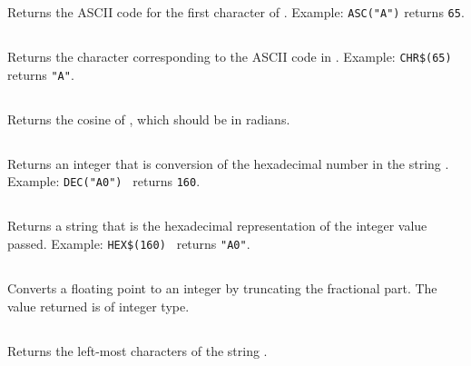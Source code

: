 \documentclass{report}
\begin{document}
    Returns the ASCII code for the first character of .
    Example: \verb+ASC("A")+ returns \verb+65+.

    \subsection*{}

    Returns the character corresponding to the ASCII code in .
    Example: \verb+CHR$(65)+ returns \verb+"A"+.
    
    \subsection*{}

    Returns the cosine of , which should be in radians.

    \subsection*{}

    Returns an integer that is conversion of the hexadecimal number in the string .
    Example: \verb+DEC("A0") + returns \verb+160+.

    \subsection*{}

    Returns a string that is the hexadecimal representation of the integer value passed.
    Example: \verb+HEX$(160) + returns \verb+"A0"+.

    \subsection*{}

    Converts a floating point  to an integer by truncating the fractional part.
    The value returned is of integer type.

    \subsection*{}

    Returns the left-most  characters of the string .
\end{document}
